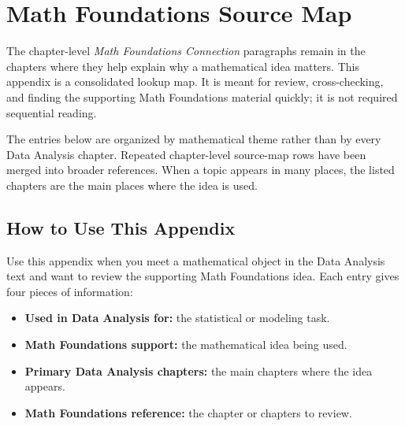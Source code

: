 \chapter{Math Foundations Source Map}
\label{app:math-foundations-source-map}

The chapter-level \emph{Math Foundations Connection} paragraphs remain in the chapters where they help explain why a mathematical idea matters. This appendix is a consolidated lookup map. It is meant for review, cross-checking, and finding the supporting Math Foundations material quickly; it is not required sequential reading.

The entries below are organized by mathematical theme rather than by every Data Analysis chapter. Repeated chapter-level source-map rows have been merged into broader references. When a topic appears in many places, the listed chapters are the main places where the idea is used.

\section{How to Use This Appendix}
Use this appendix when you meet a mathematical object in the Data Analysis text and want to review the supporting Math Foundations idea. Each entry gives four pieces of information:
\begin{itemize}[leftmargin=1.5em,itemsep=0.25em]
  \item \textbf{Used in Data Analysis for:} the statistical or modeling task.
  \item \textbf{Math Foundations support:} the mathematical idea being used.
  \item \textbf{Primary Data Analysis chapters:} the main chapters where the idea appears.
  \item \textbf{Math Foundations reference:} the chapter or chapters to review.
\end{itemize}

